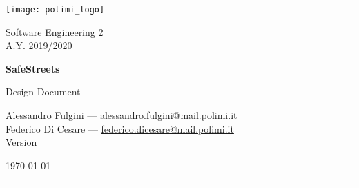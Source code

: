 
\parbox[t]{\textwidth}{ %
      \parbox[c][3\baselineskip]{.5\linewidth}{ %
        \Large\texttt{[image: polimi\_logo]}
      }%
      \parbox[c][3\baselineskip]{.5\linewidth}{ %
        \Large\raggedleft
        \sffamily\selectfont
        Software Engineering 2\\
        A.Y. 2019/2020
      }
      \parbox[t]{0.88\textwidth}{ %
        \sffamily
				\vspace{4.25cm} %

        {\fontsize{50pt}{70pt}\bfseries\selectfont SafeStreets\\}

        \vspace{0.7cm}
        {\LARGE Design Document\\}
				\vspace{30pt} %
			}
		}

    \vfill %


  	\parbox[t]{0.93\textwidth}{ %
      \sffamily
  		\large %

      Alessandro Fulgini ---
      \href{mailto:alessandro.fulgini@mail.polimi.it}{alessandro.fulgini@mail.polimi.it}\\
      Federico Di Cesare ---
      \href{mailto:federico.dicesare@mail.polimi.it}{federico.dicesare@mail.polimi.it}\\

      {Version \Version}

  		\today

  		\rule{0.275\linewidth}{1pt}%
  	}